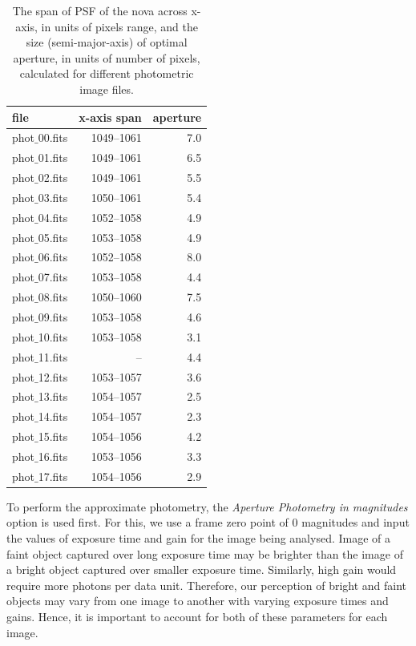 \documentclass{tda}
\begin{document}
	\begin{table} [h]
	\centering
	\begin{tabular} {l r r}
		\toprule
		\textbf{file} & \textbf{x-axis span} & \textbf{aperture} \\
		\midrule
		phot\(\_\)00.fits & 1049–1061 & 7.0 \\
		phot\(\_\)01.fits & 1049–1061 & 6.5 \\
		phot\(\_\)02.fits & 1049–1061 & 5.5 \\
		phot\(\_\)03.fits & 1050–1061 & 5.4 \\
		phot\(\_\)04.fits & 1052–1058 & 4.9 \\
		phot\(\_\)05.fits & 1053–1058 & 4.9 \\
		phot\(\_\)06.fits & 1052–1058 & 8.0 \\
		phot\(\_\)07.fits & 1053–1058 & 4.4 \\
		phot\(\_\)08.fits & 1050–1060 & 7.5 \\
		phot\(\_\)09.fits & 1053–1058 & 4.6 \\
		phot\(\_\)10.fits & 1053–1058 & 3.1 \\
		phot\(\_\)11.fits & --		  & 4.4 \\
		phot\(\_\)12.fits & 1053–1057 & 3.6 \\
		phot\(\_\)13.fits & 1054–1057 & 2.5 \\
		phot\(\_\)14.fits & 1054–1057 & 2.3 \\
		phot\(\_\)15.fits & 1054–1056 & 4.2 \\
		phot\(\_\)16.fits & 1053–1056 & 3.3 \\
		phot\(\_\)17.fits & 1054–1056 & 2.9 \\
		\bottomrule
	\end{tabular}
	\caption{The span of PSF of the nova across x-axis, in units of pixels range, and the size (semi-major-axis) of optimal aperture, in units of number of pixels, calculated for different photometric image files.}
	\label{table:aperture_and_span}
\end{table}


	To perform the approximate photometry, the \emph{Aperture Photometry in magnitudes} option is used first. For this, we use a frame zero point of 0 magnitudes and input the values of exposure time and gain for the image being analysed. Image of a faint object captured over long exposure time may be brighter than the image of a bright object captured over smaller exposure time. Similarly, high gain would require more photons per data unit. Therefore, our perception of bright and faint objects may vary from one image to another with varying exposure times and gains. Hence, it is important to account for both of these parameters for each image. 
\end{document}
